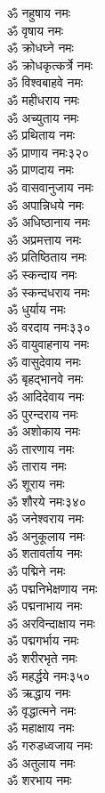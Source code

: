 \begin{multicols}{2}
\begin{flushleft}
ॐ नहुषाय नमः\\
ॐ वृषाय नमः\\
ॐ क्रोधघ्ने नमः\\
ॐ क्रोधकृत्कर्त्रे नमः\\
ॐ विश्वबाहवे नमः\\
ॐ महीधराय नमः\\
ॐ अच्युताय नमः\\
ॐ प्रथिताय नमः\\
ॐ प्राणाय नमः\hfill ३२०\\
ॐ प्राणदाय नमः\\
ॐ वासवानुजाय नमः\\
ॐ अपान्निधये नमः\\
ॐ अधिष्ठानाय नमः\\
ॐ अप्रमत्ताय नमः\\
ॐ प्रतिष्ठिताय नमः\\
ॐ स्कन्दाय नमः\\
ॐ स्कन्दधराय नमः\\
ॐ धुर्याय नमः\\
ॐ वरदाय नमः\hfill ३३०\\
ॐ वायुवाहनाय नमः\\
ॐ वासुदेवाय नमः\\
ॐ बृहद्भानवे नमः\\
ॐ आदिदेवाय नमः\\
ॐ पुरन्दराय नमः\\
ॐ अशोकाय नमः\\
ॐ तारणाय नमः\\
ॐ ताराय नमः\\
ॐ शूराय नमः\\
ॐ शौरये नमः\hfill ३४०\\
ॐ जनेश्वराय नमः\\
ॐ अनुकूलाय नमः\\
ॐ शतावर्ताय नमः\\
ॐ पद्मिने नमः\\
ॐ पद्मनिभेक्षणाय नमः\\
ॐ पद्मनाभाय नमः\\
ॐ अरविन्दाक्षाय नमः\\
ॐ पद्मगर्भाय नमः\\
ॐ शरीरभृते नमः\\
ॐ महर्द्धये नमः\hfill ३५०\\
ॐ ऋद्धाय नमः\\
ॐ वृद्धात्मने नमः\\
ॐ महाक्षाय नमः\\
ॐ गरुडध्वजाय नमः\\
ॐ अतुलाय नमः\\
ॐ शरभाय नमः\\

\end{flushleft}
\end{multicols}
